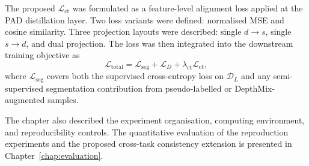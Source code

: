 The proposed $\mathcal{L}_\text{ct}$ was formulated as a feature-level
alignment loss applied at the PAD distillation layer. Two loss variants
were defined: normalised MSE and cosine similarity. Three projection
layouts were described: single $d\rightarrow s$, single $s\rightarrow d$,
and dual projection. The loss was then integrated into the downstream
training objective as
\[
    \mathcal{L}_\text{total}
    =
    \mathcal{L}_\text{seg}
    +
    \mathcal{L}_D
    +
    \lambda_\text{ct}\mathcal{L}_\text{ct},
\]
where $\mathcal{L}_\text{seg}$ covers both the supervised cross-entropy
loss on $\mathcal{D}_L$ and any semi-supervised segmentation contribution
from pseudo-labelled or DepthMix-augmented samples.

The chapter also described the experiment organisation, computing
environment, and reproducibility controls. The quantitative evaluation of
the reproduction experiments and the proposed cross-task consistency
extension is presented in Chapter~\ref{chap:evaluation}.
